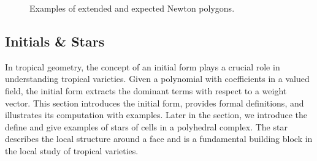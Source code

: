 \documentclass[11pt,reqno,a4paper]{article}
\theoremstyle{theoremstyle}
\theoremstyle{examplestyle}
\theoremstyle{algorithmstyle}
\numberwithin{equation}{subsection}
\begin{document}
\begin{figure}
    \centering
    \caption{Examples of extended and expected Newton polygons.}
    \label{fig:extendedNewton}
\end{figure}


\subsection{Initials \& Stars}
\label{sec:initials}
In tropical geometry, the concept of an initial form plays a crucial role in understanding tropical varieties. Given a polynomial with coefficients in a valued field, the initial form extracts the dominant terms with respect to a weight vector. This section introduces the initial form, provides formal definitions, and illustrates its computation with examples. Later in the section, we introduce the define and give examples of stars of cells in a polyhedral complex. The star describes the local structure around a face and is a fundamental building block in the local study of tropical varieties.
\end{document}
